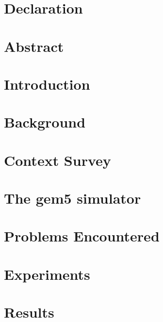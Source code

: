 \documentclass[12pt]{report}
\begin{document}
    
    
    
    \chapter*{Declaration}
    
    
    \chapter*{Abstract}
    
    
    \tableofcontents
    
    \chapter{Introduction}
    
    
    \chapter{Background}
    
    
    \chapter{Context Survey}
    
    
    \chapter{The gem5 simulator}
    
    
    \chapter{Problems Encountered}
    
    
    \chapter{Experiments}\label{ch:experiments}
    
    
    \chapter{Results}
    
    
\end{document}
